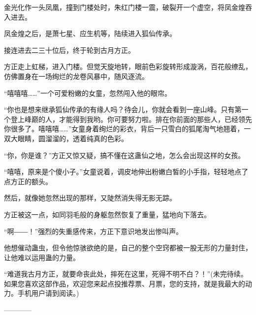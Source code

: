 \begin{this_body}
金光化作一头凤凰，撞到门楼处时，朱红门楼一震，破裂开一个虚空，将凤金煌吞入进去。

凤金煌之后，是萧七星、应生机等，陆续进入狐仙传承。

接连进去二三十位后，终于轮到古月方正。

方正走上虹梯，进入门楼。但觉天旋地转，眼前色彩旋转形成漩涡，百花般缭乱，仿佛置身在一场绚烂的龙卷风暴中，随风逐流。

“嘻嘻嘻……”一个可爱粉嫩的女童，忽然闯入他的眼帘。

“你也是想来继承狐仙传承的有缘人吗？待会儿，你就会看到一座山峰。只有第一个登上峰巅的人，才能得到我哟。你可要努力啦。排在你前面的那些人，已经领先你很多了。嘻嘻嘻……”女童身着绚烂的彩衣，背后一只雪白的狐尾淘气地翘着，一双大眼睛，圆溜溜的，透着纯真的色彩。

“你，你是谁？”方正又惊又疑，搞不懂在这蛊仙之地，怎么会出现这样的女孩。

“嘻嘻，原来是个傻小子。”女童说着，调皮地伸出粉嫩白皙的小手指，轻轻地点了点方正的额头。

然后，就像她忽然出现的那样，又陡然消失得无影无踪。

方正被这一点，如同羽毛般的身躯忽然恢复了重量，猛地向下落去。

“啊――！”强烈的失重感传来，方正下意识地发出惨叫声。

他想催动蛊虫，但令他惊骇欲绝的是，自己的整个空窍都被一股无形的力量封住，让他难以运用蛊的力量。

“难道我古月方正，就要命丧此处，摔死在这里，死得不明不白？！”(未完待续。如果您喜欢这部作品，欢迎您来起点投推荐票、月票，您的支持，就是我最大的动力。手机用户请到阅读。)

------------

\end{this_body}

